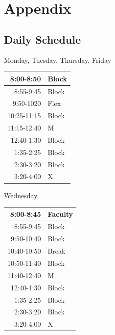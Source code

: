 \chapter{Appendix}

\section{Daily Schedule}

\begin{minipage}{.5\textwidth}
  \begin{center}
  Monday, Tuesday, Thursday, Friday\\
  \begin{tabular}{|r|l|}
    \hline
    8:00-8:50		&Block   \\
    \hline    
    8:55-9:45		&Block   \\
        \hline
    9:50-1020	&	Flex   \\
    \hline    
    10:25-11:15	&Block   \\
    \hline    
    11:15-12:40	&M       \\
      \hline  
    12:40-1:30	&	Block  \\
      \hline  
    1:35-2:25		&Block   \\
      \hline  
    2:30-3:20		&Block   \\
        \hline
    3:20-4:00		&X\\
        \hline
  \end{tabular}\end{center}
\end{minipage}
\begin{minipage}{.5\textwidth}
\begin{center}Wednesday\\
\begin{tabular}{|r|l|}
      \hline
8:00-8:45		&Faculty   \\
    \hline
8:55-9:45		&Block     \\
    \hline
9:50-10:40	&	Block    \\
    \hline
10:40-10:50	&	Break    \\
    \hline    
10:50-11:40	&Block     \\
    \hline
11:40-12:40	&M         \\
    \hline
12:40-1:30	&	Block    \\
    \hline
1:35-2:25		&Block     \\
    \hline
2:30-3:20		&Block     \\
    \hline
3:20-4:00		&X\\
    \hline
\end{tabular}  \end{center}
\end{minipage}

